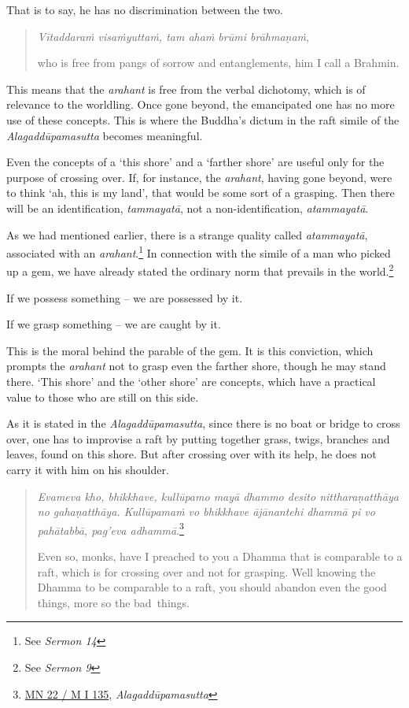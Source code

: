 That is to say, he has no discrimination between the two.

\begin{quote}
\emph{Vītaddaraṁ visaṁyuttaṁ, tam ahaṁ brūmi brāhmaṇaṁ},

who is free from pangs of sorrow and entanglements, him I call a Brahmin.
\end{quote}

This means that the \emph{arahant} is free from the verbal dichotomy, which is of relevance to the worldling. Once gone beyond, the emancipated one has no more use of these concepts. This is where the Buddha's dictum in the raft simile of the \emph{Alagaddūpamasutta} becomes meaningful.

Even the concepts of a `this shore' and a `farther shore' are useful only for the purpose of crossing over. If, for instance, the \emph{arahant}, having gone beyond, were to think `ah, this is my land', that would be some sort of a grasping. Then there will be an identification, \emph{tammayatā}, not a non-identification, \emph{atammayatā}.

As we had mentioned earlier, there is a strange quality called \emph{atammayatā}, associated with an \emph{arahant}.\footnote{See \emph{Sermon 14}} In connection with the simile of a man who picked up a gem, we have already stated the ordinary norm that prevails in the world.\footnote{See \emph{Sermon 9}}

If we possess something -- we are possessed by it.

If we grasp something -- we are caught by it.

This is the moral behind the parable of the gem. It is this conviction, which prompts the \emph{arahant} not to grasp even the farther shore, though he may stand there. `This shore' and the `other shore' are concepts, which have a practical value to those who are still on this side.

As it is stated in the \emph{Alagaddūpamasutta}, since there is no boat or bridge to cross over, one has to improvise a raft by putting together grass, twigs, branches and leaves, found on this shore. But after crossing over with its help, he does not carry it with him on his shoulder.

\begin{quote}
\emph{Evameva kho, bhikkhave, kullūpamo mayā dhammo desito nittharaṇatthāya no gahaṇatthāya. Kullūpamaṁ vo bhikkhave ājānantehi dhammā pi vo pahātabbā, pag'eva adhammā}.\footnote{\href{https://suttacentral.net/mn22/pli/ms}{MN 22 / M I 135}, \emph{Alagaddūpamasutta}}

Even so, monks, have I preached to you a Dhamma that is comparable to a raft, which is for crossing over and not for grasping. Well knowing the Dhamma to be comparable to a raft, you should abandon even the good things, more so the bad~things.
\end{quote}

